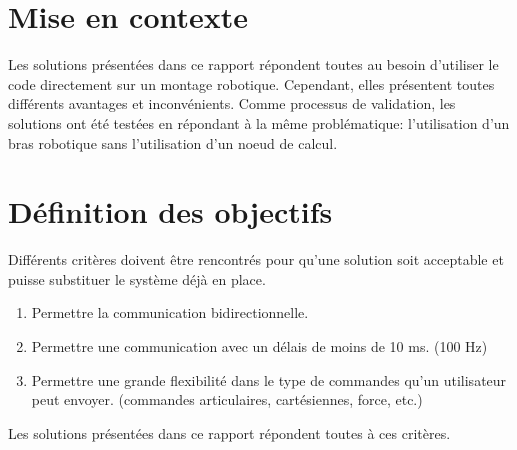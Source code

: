 \documentclass[root.tex]{subfiles}
\begin{document}
\section{Mise en contexte}

Les solutions présentées dans ce rapport répondent toutes au besoin d'utiliser le code directement sur un montage robotique. 
Cependant, elles présentent toutes différents avantages et inconvénients. 
Comme processus de validation, les solutions ont été testées en répondant à la même problématique: l'utilisation d'un bras robotique sans l'utilisation d'un noeud de calcul.


\section{Définition des objectifs}

Différents critères doivent être rencontrés pour qu'une solution soit acceptable et puisse substituer le système déjà en place.

\begin{enumerate}
\item Permettre la communication bidirectionnelle.
\item Permettre une communication avec un délais de moins de 10 ms. (100 Hz)
\item Permettre une grande flexibilité dans le type de commandes qu'un utilisateur peut envoyer. (commandes articulaires, cartésiennes, force, etc.)
\end{enumerate}
Les solutions présentées dans ce rapport répondent toutes à ces critères.


\newpage
\end{document}
